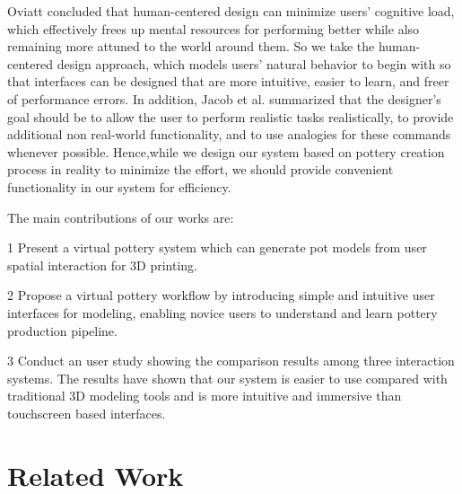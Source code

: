 Oviatt \cite{oviatt2006human} concluded that human-centered design can minimize users’ cognitive load, which effectively frees up mental resources for performing better while also remaining more attuned to the world around them. So we take the human-centered design approach, which models users’ natural behavior to begin with so that interfaces can be designed that are more intuitive, easier to learn, and freer of performance errors. In addition, Jacob et al. \cite{Jacob2008Reality} summarized that the designer's goal should be to allow the user to perform realistic tasks realistically, to provide additional non real-world functionality, and to use analogies for these commands whenever possible. Hence,while we design our system based on pottery creation process in reality to minimize the effort, we should provide convenient functionality in our system for efficiency.

The main contributions of our works are:

1 Present a virtual pottery system which can generate pot models from user spatial interaction for 3D printing.

2 Propose a virtual pottery workflow by introducing simple and intuitive user interfaces for modeling, enabling novice users to understand and learn pottery production pipeline.

3 Conduct an user study showing the comparison results among three interaction systems. The results have shown that our system is easier to use compared with traditional 3D modeling tools and is more intuitive and immersive than touchscreen based interfaces.




\section{Related Work}
\label{sec:2}

